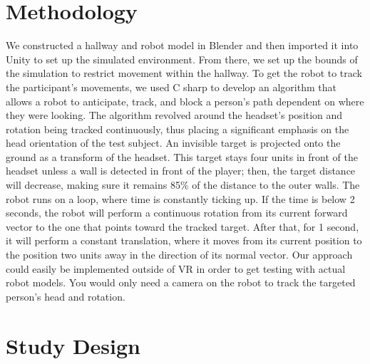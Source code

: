 \documentclass[letterpaper, 10 pt, conference]{ieeeconf}
\begin{document}
\section{Methodology}
    We constructed a hallway and robot model in Blender and then imported it into Unity to set up the simulated environment. From there, we set up the bounds of the simulation to restrict movement within the hallway.
    To get the robot to track the participant's movements, we used C sharp to develop an algorithm that allows a robot to anticipate, track, and block a person's path dependent on where they were looking.
        The algorithm revolved around the headset's position and rotation being tracked continuously, thus placing a significant emphasis on the head orientation of the test subject.
         An invisible target is projected onto the ground as a transform of the headset. This target stays four units in front of the headset unless a wall is detected in front of the player; then, the target distance will decrease, making sure it remains 85\% of the distance to the outer walls. The robot runs on a loop, where time is constantly ticking up. If the time is below 2 seconds, the robot will perform a continuous rotation from its current forward vector to the one that points toward the tracked target. After that, for 1 second, it will perform a constant translation, where it moves from its current position to the position two units away in the direction of its normal vector. Our approach could easily be implemented outside of VR in order to get testing with actual robot models. You would only need a camera on the robot to track the targeted person's head and rotation. 

\section{Study Design}
\end{document}
